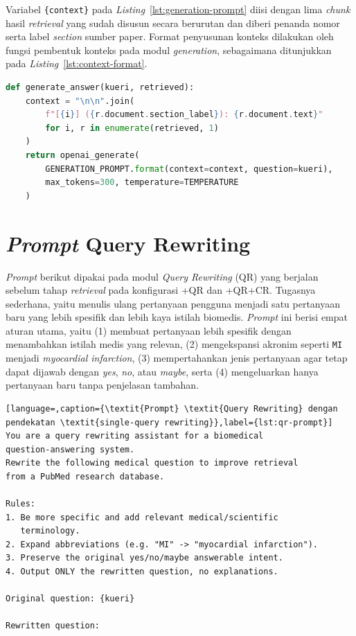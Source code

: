 Variabel \texttt{\{context\}} pada \textit{Listing}~\ref{lst:generation-prompt} diisi dengan lima \textit{chunk} hasil \textit{retrieval} yang sudah disusun secara berurutan dan diberi penanda nomor serta label \textit{section} sumber paper. Format penyusunan konteks dilakukan oleh fungsi pembentuk konteks pada modul \textit{generation}, sebagaimana ditunjukkan pada \textit{Listing}~\ref{lst:context-format}.

\begin{lstlisting}[language=Python,caption={Fungsi pembentuk \texttt{\{context\}} untuk diteruskan ke \textit{prompt}},label={lst:context-format}]
def generate_answer(kueri, retrieved):
    context = "\n\n".join(
        f"[{i}] ({r.document.section_label}): {r.document.text}"
        for i, r in enumerate(retrieved, 1)
    )
    return openai_generate(
        GENERATION_PROMPT.format(context=context, question=kueri),
        max_tokens=300, temperature=TEMPERATURE
    )
\end{lstlisting}

\section{\textit{Prompt} Query Rewriting}
\label{lamp:prompt-qr}

\textit{Prompt} berikut dipakai pada modul \textit{Query Rewriting} (QR) yang berjalan sebelum tahap \textit{retrieval} pada konfigurasi +QR dan +QR+CR. Tugasnya sederhana, yaitu menulis ulang pertanyaan pengguna menjadi satu pertanyaan baru yang lebih spesifik dan lebih kaya istilah biomedis. \textit{Prompt} ini berisi empat aturan utama, yaitu (1) membuat pertanyaan lebih spesifik dengan menambahkan istilah medis yang relevan, (2) mengekspansi akronim seperti \texttt{MI} menjadi \textit{myocardial infarction}, (3) mempertahankan jenis pertanyaan agar tetap dapat dijawab dengan \textit{yes}, \textit{no}, atau \textit{maybe}, serta (4) mengeluarkan hanya pertanyaan baru tanpa penjelasan tambahan.

\begin{lstlisting}[language=,caption={\textit{Prompt} \textit{Query Rewriting} dengan pendekatan \textit{single-query rewriting}},label={lst:qr-prompt}]
You are a query rewriting assistant for a biomedical
question-answering system.
Rewrite the following medical question to improve retrieval
from a PubMed research database.

Rules:
1. Be more specific and add relevant medical/scientific
   terminology.
2. Expand abbreviations (e.g. "MI" -> "myocardial infarction").
3. Preserve the original yes/no/maybe answerable intent.
4. Output ONLY the rewritten question, no explanations.

Original question: {kueri}

Rewritten question:
\end{lstlisting}


